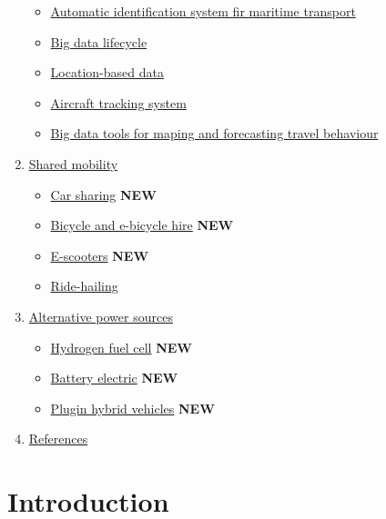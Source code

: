 \documentclass[
]{book}
\providecommand{\tightlist}{%
  \setlength{\itemsep}{0pt}\setlength{\parskip}{0pt}}
\begin{document}
\begin{enumerate}
  \begin{itemize}
  \tightlist
  \item
    \protect\hyperlink{maritime_transport}{Automatic identification system fir maritime transport}
  \item
    \protect\hyperlink{bd_life}{Big data lifecycle}
  \item
    \protect\hyperlink{location_data}{Location-based data}
  \item
    \protect\hyperlink{aircraft_tracking}{Aircraft tracking system}
  \item
    \protect\hyperlink{bd_tool_maping}{Big data tools for maping and forecasting travel behaviour}
  \end{itemize}
\item
  \protect\hyperlink{shared}{Shared mobility}

  \begin{itemize}
  \tightlist
  \item
    \protect\hyperlink{car_sharing}{Car sharing} \textbf{NEW}
  \item
    \protect\hyperlink{bike_sharing}{Bicycle and e-bicycle hire} \textbf{NEW}
  \item
    \protect\hyperlink{scooters}{E-scooters} \textbf{NEW}
  \item
    \protect\hyperlink{ride_hailing}{Ride-hailing}
  \end{itemize}
\item
  \protect\hyperlink{alternative}{Alternative power sources}

  \begin{itemize}
  \tightlist
  \item
    \protect\hyperlink{FCEV}{Hydrogen fuel cell} \textbf{NEW}
  \item
    \protect\hyperlink{bev}{Battery electric} \textbf{NEW}
  \item
    \protect\hyperlink{plugin_hybrid}{Plugin hybrid vehicles} \textbf{NEW}
  \end{itemize}
\item
  \protect\hyperlink{reference}{References}
\end{enumerate}

\hypertarget{intro}{%
\chapter{Introduction}\label{intro}}
\end{document}
